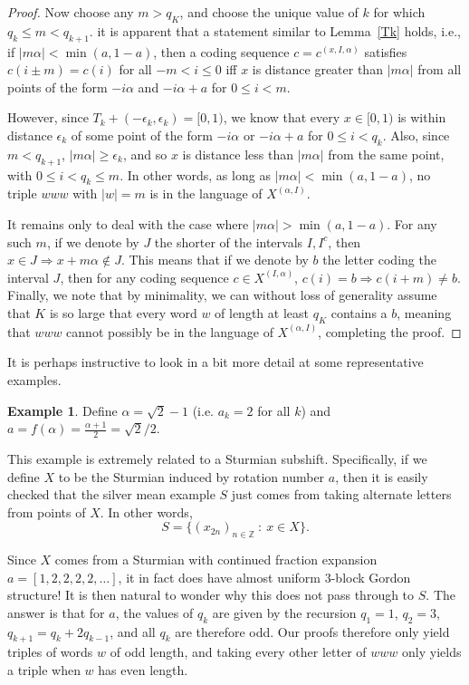\documentclass[11pt,reqno]{amsart}
\theoremstyle{definition}
\newtheorem{example}[theorem]{Example}
\theoremstyle{plain}
\begin{document}
\begin{proof}
Now choose any $m > q_K$, and choose the unique value of $k$ for which $q_k \leq m < q_{k+1}$. it is apparent that a statement similar to Lemma~\ref{Tk} holds, i.e., if $|m \alpha| < \min(a, 1-a)$, then a coding sequence 
$c = c^{(x,I,\alpha)}$ satisfies $c(i \pm m) = c(i)$ for all $-m < i \leq 0$ iff $x$ is distance greater than $|m \alpha|$ from all points of the form $-i\alpha$ and $-i\alpha + a$ for $0 \leq i < m$. 

However, since $T_k + (-\epsilon_k, \epsilon_k) = [0,1)$, we know that every $x \in [0,1)$ is within distance $\epsilon_k$ of some point of the form
$-i\alpha$ or $-i\alpha + a$ for $0 \leq i < q_k$. Also, since $m < q_{k+1}$, $|m \alpha| \geq \epsilon_k$, and so 
$x$ is distance less than $|m \alpha|$ from the same point, with $0 \leq i < q_k \leq m$. In other words, as long as $|m \alpha| < \min(a, 1-a)$, no triple $www$ with $|w| = m$ is in the language of $X^{(\alpha, I)}$. 

It remains only to deal with the case where $|m \alpha| > \min(a, 1-a)$. For any such $m$, if we denote by $J$ the shorter of the intervals $I, I^c$, then $x \in J \Longrightarrow x + m\alpha \notin J$. This means that if we denote by $b$ the letter coding the interval $J$, then for any coding sequence $c \in X^{(I,\alpha)}$, $c(i) = b \Longrightarrow c(i+m) \neq b$. Finally, we note that by minimality, we can without loss of generality assume that $K$ is so large that 
every word $w$ of length at least $q_K$ contains a $b$, meaning that $www$ cannot possibly be in the language of $X^{(\alpha, I)}$, completing the proof.

\end{proof}

It is perhaps instructive to look in a bit more detail at some representative examples.

\begin{example}\label{ex1}
Define $\alpha = \sqrt{2}-1$ (i.e. $a_k = 2$ for all $k$) and 
$a = f(\alpha) = \frac{\alpha+1}{2} = \sqrt{2}/2$. 

This example is extremely related to a Sturmian subshift. Specifically, if we define 
$X$ to be the Sturmian induced by rotation number $a$, then it is easily checked that the silver mean example $S$ just comes from taking alternate letters from points of $X$. In other words,
\[
S = \{(x_{2n})_{n \in \mathbb{Z}} \ : \ x \in X\}.
\]

Since $X$ comes from a Sturmian with continued fraction expansion $a = [1,2,2,2,2,\ldots]$, it in fact does have almost uniform $3$-block Gordon structure! It is then natural to wonder why this does not pass through to $S$. The answer is that 
for $a$, the values of $q_k$ are given by the recursion $q_1 = 1$, $q_2 = 3$, $q_{k+1} = q_k + 2q_{k-1}$, and all $q_k$ are therefore odd. Our proofs therefore only yield triples of words $w$ of odd length, and taking every other letter of $www$ only yields a triple when $w$ has even length.
\end{example}
\end{document}
